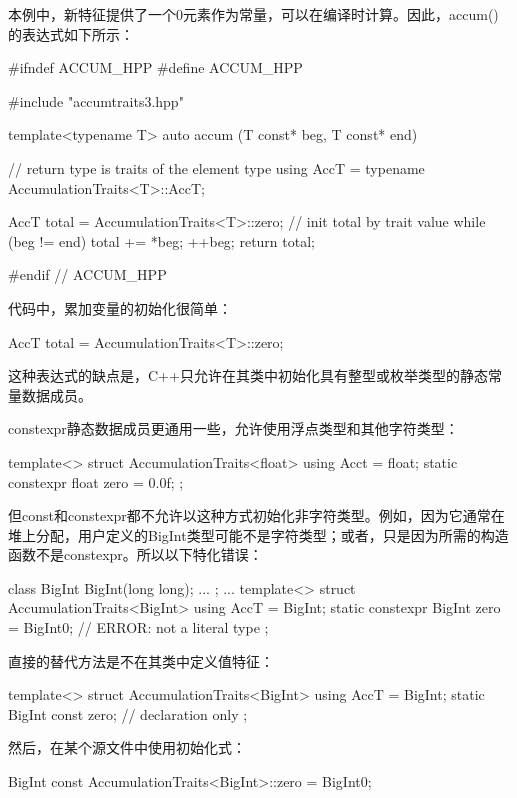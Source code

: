 本例中，新特征提供了一个0元素作为常量，可以在编译时计算。因此，accum()的表达式如下所示：

\begin{cpp}
#ifndef ACCUM_HPP
#define ACCUM_HPP

#include "accumtraits3.hpp"

template<typename T>
auto accum (T const* beg, T const* end) {
	// return type is traits of the element type
	using AccT = typename AccumulationTraits<T>::AccT;
	
	AccT total = AccumulationTraits<T>::zero; // init total by trait value
	while (beg != end) {
		total += *beg;
		++beg;
	}
	return total;
}

#endif // ACCUM_HPP
\end{cpp}

代码中，累加变量的初始化很简单：

\begin{cpp}
AccT total = AccumulationTraits<T>::zero;
\end{cpp}

这种表达式的缺点是，C++只允许在其类中初始化具有整型或枚举类型的静态常量数据成员。

constexpr静态数据成员更通用一些，允许使用浮点类型和其他字符类型：

\begin{cpp}
template<>
struct AccumulationTraits<float> {
	using Acct = float;
	static constexpr float zero = 0.0f;
};
\end{cpp}

但const和constexpr都不允许以这种方式初始化非字符类型。例如，因为它通常在堆上分配，用户定义的BigInt类型可能不是字符类型；或者，只是因为所需的构造函数不是constexpr。所以以下特化错误：

\begin{cpp}
class BigInt {
	BigInt(long long);
	...
};
...
template<>
struct AccumulationTraits<BigInt> {
	using AccT = BigInt;
	static constexpr BigInt zero = BigInt{0}; // ERROR: not a literal type
};
\end{cpp}

直接的替代方法是不在其类中定义值特征：

\begin{cpp}
template<>
struct AccumulationTraits<BigInt> {
	using AccT = BigInt;
	static BigInt const zero; // declaration only
};
\end{cpp}

然后，在某个源文件中使用初始化式：

\begin{cpp}
BigInt const AccumulationTraits<BigInt>::zero = BigInt{0};
\end{cpp}

